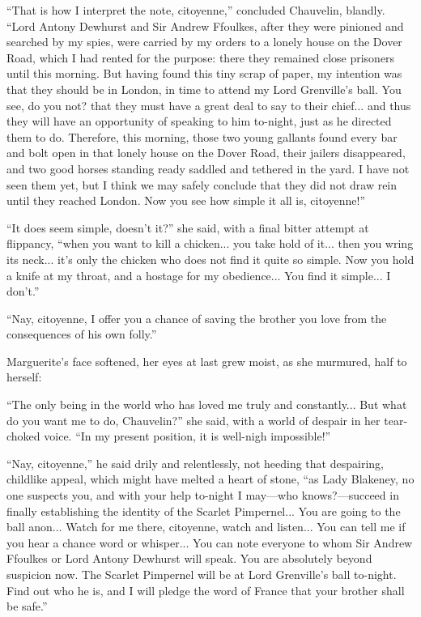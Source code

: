 \documentclass[paper=5.5in:8.5in,BCOR=7mm,twoside,DIV=calc,12pt,usegeometry,chapterprefix,endperiod,headings=big]{scrbook}
\begin{document}
\enquote{That is how I interpret the note, citoyenne,} concluded Chauvelin, blandly. \enquote{Lord Antony Dewhurst and Sir Andrew Ffoulkes, after they were pinioned and searched by my spies, were carried by my orders to a lonely house on the Dover Road, which I had rented for the purpose: there they remained close prisoners until this morning. But having found this tiny scrap of paper, my intention was that they should be in London, in time to attend my Lord Grenville's ball. You see, do you not? that they must have a great deal to say to their chief... and thus they will have an opportunity of speaking to him to-night, just as he directed them to do. Therefore, this morning, those two young gallants found every bar and bolt open in that lonely house on the Dover Road, their jailers disappeared, and two good horses standing ready saddled and tethered in the yard. I have not seen them yet, but I think we may safely conclude that they did not draw rein until they reached London. Now you see how simple it all is, citoyenne!}

\enquote{It does seem simple, doesn't it?} she said, with a final bitter attempt at flippancy, \enquote{when you want to kill a chicken... you take hold of it... then you wring its neck... it's only the chicken who does not find it quite so simple. Now you hold a knife at my throat, and a hostage for my obedience... You find it simple... I don't.}

\enquote{Nay, citoyenne, I offer you a chance of saving the brother you love from the consequences of his own folly.}

Marguerite's face softened, her eyes at last grew moist, as she murmured, half to herself:

\enquote{The only being in the world who has loved me truly and constantly... But what do you want me to do, Chauvelin?} she said, with a world of despair in her tear-choked voice. \enquote{In my present position, it is well-nigh impossible!}

\enquote{Nay, citoyenne,} he said drily and relentlessly, not heeding that despairing, childlike appeal, which might have melted a heart of stone, \enquote{as Lady Blakeney, no one suspects you, and with your help to-night I may---who knows?---succeed in finally establishing the identity of the Scarlet Pimpernel... You are going to the ball anon... Watch for me there, citoyenne, watch and listen... You can tell me if you hear a chance word or whisper... You can note everyone to whom Sir Andrew Ffoulkes or Lord Antony Dewhurst will speak. You are absolutely beyond suspicion now. The Scarlet Pimpernel will be at Lord Grenville's ball to-night. Find out who he is, and I will pledge the word of France that your brother shall be safe.}
\end{document}
